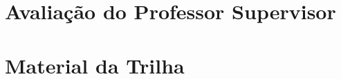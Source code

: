 \begin{anexosenv}
	\chapter{Avaliação do Professor Supervisor} %
	\label{chap:Avaliação do Professor Supervisor}
	
	\chapter{Material da Trilha} %
	\label{chap:Material da Trilha}
	
\end{anexosenv}

